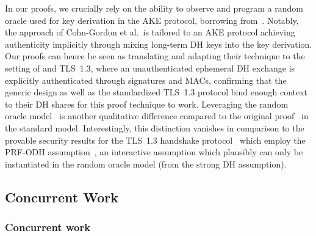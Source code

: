 In our proofs, we crucially rely on the ability to observe and program a random oracle used for key derivation in the AKE protocol, borrowing from~\cite{C:CCGJJ19}.
Notably, the approach of Cohn-Gordon et al.\ is tailored to an AKE protocol achieving authenticity implicitly through mixing long-term DH keys into the key derivation.
Our proofs can hence be seen as translating and adapting their technique to the setting of \SIGMA and TLS~1.3, where an unauthenticated ephemeral DH exchange is explicitly authenticated through signatures and MACs,
confirming that the generic \SIGMA design as well as the standardized TLS~1.3 protocol bind enough context to their DH shares for this proof technique to work.
Leveraging the random oracle model~\cite{CCS:BelRog93} is another qualitative difference compared to the original \SIGMA proof~\cite{C:CanKra02} in the standard model.
Interestingly, this distinction vanishes in comparison to the provable security results for the TLS~1.3 handshake protocol~\cite{CCS:DFGS15,EPRINT:DFGS16,EuroSP:FisGue17,JC:DFGS21} which employ the PRF-ODH assumption~\cite{C:JKSS12,C:BFGJ17},
an interactive assumption which plausibly can only be instantiated in the random oracle model (from the strong DH assumption).
\fi


\iffull
\subsection{Concurrent Work}
\else
\subsubsection*{Concurrent work\lncsdot}
\fi

